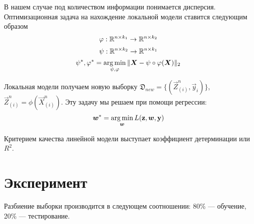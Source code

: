 \documentclass[12pt, twoside]{article}
\begin{document}
В нашем случае под количеством информации понимается дисперсия.
Оптимизационная задача на нахождение локальной модели ставится следующим образом
\[
	\phi: \RR^{n \times k_1} \rightarrow \RR^{n \times k_2}
\]
\[
	\psi: \RR^{n \times k_2} \rightarrow \RR^{n \times k_1}
\]
\[
	\psi^*, \phi^* = \argmin_{\psi, \phi} \|\vec{X} - \psi \circ \phi (\vec{X}) \|_2
\]

Локальная модели получаем новую выборку $\mathfrak{D}_{new} = \{(\vec{Z}_{(i)}^{n}, \vec{y}_i)\}$, $\vec{Z}_{(i)}^{n} = \phi(\vec{X}_{(i)}^{n})$. Эту задачу мы решаем при помощи регрессии:
\[
	\vec{w}^* = \argmin_{\vec{w}} L(\mathbf{z}, \vec{w}, \mathbf{y})
\]

Критерием качества линейной модели выступает коэффициент детерминации или $R^2$.


\section{Эксперимент}

Разбиение выборки производится в следующем соотношении: 80\% --- обучение, 20\% --- тестирование.

\newpage


\end{document}
